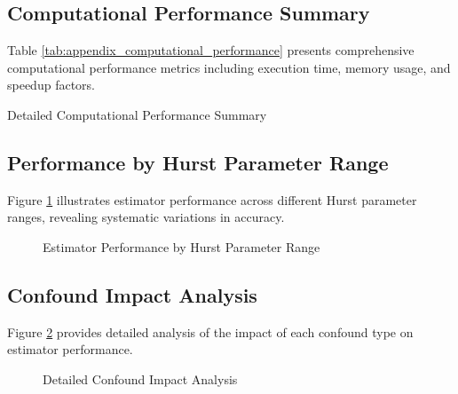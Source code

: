 \subsection{Computational Performance Summary}

Table \ref{tab:appendix_computational_performance} presents comprehensive computational performance metrics including execution time, memory usage, and speedup factors.

\begin{table}[h]
\centering
\caption{Detailed Computational Performance Summary}
\label{tab:appendix_computational_performance}
\end{table}

\subsection{Performance by Hurst Parameter Range}

Figure \ref{fig:appendix_hurst_performance} illustrates estimator performance across different Hurst parameter ranges, revealing systematic variations in accuracy.

\begin{figure}[h]
\centering
\caption{Estimator Performance by Hurst Parameter Range}
\label{fig:appendix_hurst_performance}
\end{figure}

\subsection{Confound Impact Analysis}

Figure \ref{fig:appendix_confound_impact} provides detailed analysis of the impact of each confound type on estimator performance.

\begin{figure}[h]
\centering
\caption{Detailed Confound Impact Analysis}
\label{fig:appendix_confound_impact}
\end{figure}
